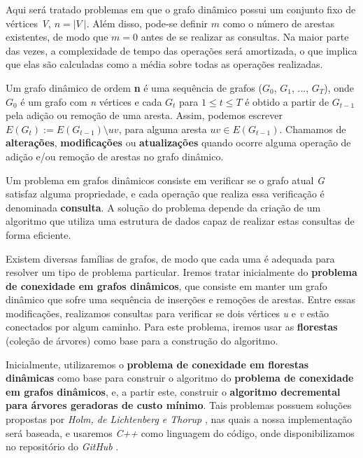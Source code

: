 Aqui será tratado problemas em que o grafo dinâmico possui um conjunto fixo de vértices \textit{V}, $n = |\textit{V}\ |$. Além disso, pode-se definir $m$ como o número de arestas existentes, de modo que $m = 0$ antes de se realizar as consultas. Na maior parte das vezes, a complexidade de tempo das operações será amortizada, o que implica que elas são calculadas como a média sobre todas as operações realizadas. 


Um grafo dinâmico de ordem \textbf{n} é uma sequência de grafos ($G_0$, $G_1$, ..., $G_T$), onde $G_0$ é um grafo com \textit{n} vértices e cada $G_t$ para $1 \leq t \leq T$ é obtido a partir de $G_{t-1}$ pela adição ou remoção de uma aresta. Assim, podemos escrever $E(G_{t}) := E(G_{t - 1}) \setminus {uv}$, para alguma aresta $uv \in E(G_{t-1})$. Chamamos de \textbf{alterações}, \textbf{modificações} ou \textbf{atualizações} quando ocorre alguma operação de adição e/ou remoção de arestas no grafo dinâmico.

Um problema em grafos dinâmicos consiste em verificar se o grafo atual \textit{G} satisfaz alguma propriedade, e cada operação que realiza essa verificação é denominada \textbf{consulta}. A solução do problema depende da criação de um algoritmo que utiliza uma estrutura de dados capaz de realizar estas consultas de forma eficiente. 

Existem diversas famílias de grafos, de modo que cada uma é adequada para resolver um tipo de problema particular. Iremos tratar inicialmente do \textbf{problema de conexidade em grafos dinâmicos}, que consiste em manter um grafo dinâmico que sofre uma sequência de inserções e remoções de arestas. Entre essas modificações, realizamos consultas para verificar se dois vértices \textit{u} e \textit{v} estão conectados por algum caminho. Para este problema, iremos usar as \textbf{florestas} (coleção de árvores) como base para a construção do algoritmo.

Inicialmente, utilizaremos o \textbf{problema de conexidade em florestas dinâmicas} como base para construir o algoritmo do \textbf{problema de conexidade em grafos dinâmicos}, e, a partir este, construir o \textbf{algoritmo decremental para árvores geradoras de custo mínimo}. Tais problemas possuem soluções propostas por \textit{Holm, de Lichtenberg e Thorup} \cite{jacob_holm}, nas quais a nossa implementação será baseada, e usaremos \textit{C++} como linguagem do código, onde disponibilizamos no repositório do \textit{GitHub} \cite{chung2025}.